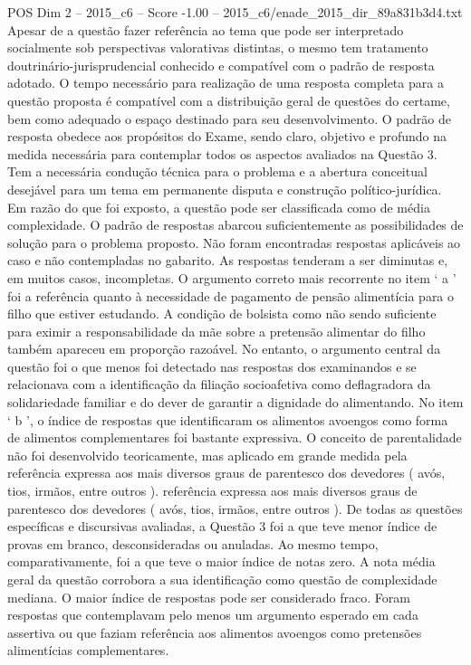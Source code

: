 \begin{textsample}{POS Dim 2 – 2015\_c6 – Score -1.00 – 2015\_c6/enade\_2015\_dir\_89a831b3d4.txt}
Apesar de a questão fazer referência ao tema que pode ser interpretado socialmente sob perspectivas valorativas distintas, o mesmo tem tratamento doutrinário-jurisprudencial conhecido e compatível com o padrão de resposta adotado.
O tempo necessário para realização de uma resposta completa para a questão proposta é compatível com a distribuição geral de questões do certame, bem como adequado o espaço destinado para seu desenvolvimento.
O padrão de resposta obedece aos propósitos do Exame, sendo claro, objetivo e profundo na medida necessária para contemplar todos os aspectos avaliados na Questão 3.
Tem a necessária condução técnica para o problema e a abertura conceitual desejável para um tema em permanente disputa e construção político-jurídica.
Em razão do que foi exposto, a questão pode ser classificada como de média complexidade.
O padrão de respostas abarcou suficientemente as possibilidades de solução para o problema proposto.
Não foram encontradas respostas aplicáveis ao caso e não contempladas no gabarito.
As respostas tenderam a ser diminutas e, em muitos casos, incompletas.
O argumento correto mais recorrente no item ‘ a ’ foi a referência quanto à necessidade de pagamento de pensão alimentícia para o filho que estiver estudando.
A condição de bolsista como não sendo suficiente para eximir a responsabilidade da mãe sobre a pretensão alimentar do filho também apareceu em proporção razoável.
No entanto, o argumento central da questão foi o que menos foi detectado nas respostas dos examinandos e se relacionava com a identificação da filiação socioafetiva como deflagradora da solidariedade familiar e do dever de garantir a dignidade do alimentando.
No item ‘ b ’, o índice de respostas que identificaram os alimentos avoengos como forma de alimentos complementares foi bastante expressiva.
O conceito de parentalidade não foi desenvolvido teoricamente, mas aplicado em grande medida pela referência expressa aos mais diversos graus de parentesco dos devedores ( avós, tios, irmãos, entre outros ). referência expressa aos mais diversos graus de parentesco dos devedores ( avós, tios, irmãos, entre outros ).
De todas as questões específicas e discursivas avaliadas, a Questão 3 foi a que teve menor índice de provas em branco, desconsideradas ou anuladas.
Ao mesmo tempo, comparativamente, foi a que teve o maior índice de notas zero.
A nota média geral da questão corrobora a sua identificação como questão de complexidade mediana.
O maior índice de respostas pode ser considerado fraco.
Foram respostas que contemplavam pelo menos um argumento esperado em cada assertiva ou que faziam referência aos alimentos avoengos como pretensões alimentícias complementares.

\end{textsample}
